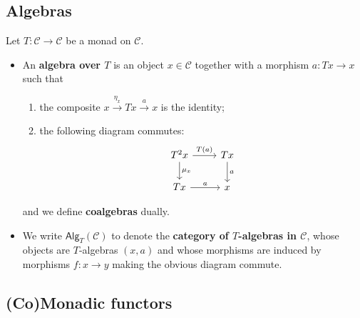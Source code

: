 \documentclass[10pt]{article}
\newcommand{\ccat}{\mathcal{C}}
\newcommand{\Alg}{\mathsf{Alg}}
\begin{document}
        \subsection{Algebras}

            Let $T\colon\ccat\to\ccat$ be a monad on $\ccat$.

            \begin{itemize}
                \item An \textbf{algebra over $T$} is an object $x\in\ccat$ together with a morphism $a\colon Tx\to x$ such that
                \begin{enumerate}
                     \item the composite $x\xrightarrow{\eta_x}Tx\xrightarrow{a}x$ is the identity;
                     \item the following diagram commutes:
                        \begin{equation*}
                            \begin{tikzcd}
                                T^2x \ar{r}{T(a)} \ar{d}{\mu_x}
                                & Tx \ar{d}{a}\\
                                Tx \ar{r}{a}
                                & x
                            \end{tikzcd}
                        \end{equation*}
                \end{enumerate}
                and we define \textbf{coalgebras} dually.
                \item We write $\Alg_T(\ccat)$ to denote the \textbf{category of $T$-algebras in $\ccat$}, whose objects are $T$-algebras $(x,a)$ and whose morphisms are induced by morphisms $f\colon x\to y$ making the obvious diagram commute.
            \end{itemize}

        \subsection{(Co)Monadic functors}
\end{document}
